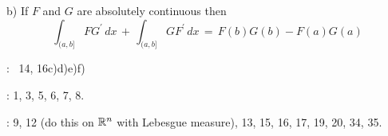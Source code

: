 \smallskip
b)  If  $F$ and $G$ are absolutely continuous then 
$$ \int_{(a, b]} F G^{\prime} \, dx \,+\,  \int_{(a, b]} G F^{\prime} \, dx \, =\, F(b)G(b) - F(a)G(a) $$

\bigskip

:  \, 14, 16c)d)e)f) 
 
 \bigskip
 
 \bigskip
 
 \endhead
\medskip

:  1, 3, 5, 6, 7, 8.


\endhead
\medskip

: 9,  12 (do this on $\Bbb R^n$ with Lebesgue measure), 13, 15, 16, 17, 19, 20, 34, 35.


%
 
 \enddocument



                                               













